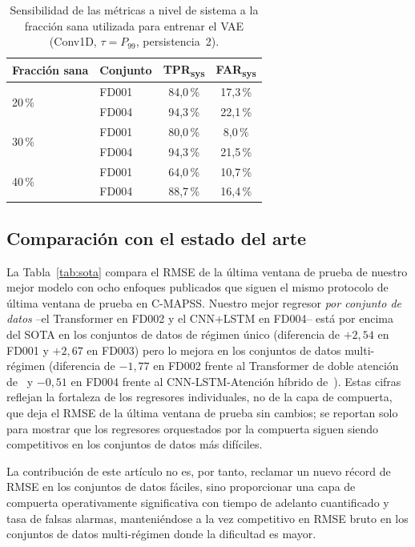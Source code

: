 \documentclass[5p,times,authoryear]{elsarticle}
\begin{document}
\begin{table}[!t]
\centering
\caption{Sensibilidad de las métricas a nivel de sistema a la fracción sana utilizada para entrenar el VAE (Conv1D, $\tau{=}P_{99}$, persistencia~2).}
\label{tab:c5}
\small
\begin{tabular}{llcc}
\toprule
Fracción sana & Conjunto & TPR\textsubscript{sys} & FAR\textsubscript{sys} \\
\midrule
\multirow{2}{*}{20\,\%} & FD001 & 84,0\,\% & 17,3\,\% \\
                        & FD004 & 94,3\,\% & 22,1\,\% \\
\multirow{2}{*}{30\,\%} & FD001 & 80,0\,\% & 8,0\,\% \\
                        & FD004 & 94,3\,\% & 21,5\,\% \\
\multirow{2}{*}{40\,\%} & FD001 & 64,0\,\% & 10,7\,\% \\
                        & FD004 & 88,7\,\% & 16,4\,\% \\
\bottomrule
\end{tabular}
\end{table}

\subsection{Comparación con el estado del arte}\label{sec:results-sota}

La Tabla~\ref{tab:sota} compara el RMSE de la última ventana de prueba de nuestro mejor modelo con ocho enfoques publicados que siguen el mismo protocolo de última ventana de prueba en C-MAPSS. Nuestro mejor regresor \emph{por conjunto de datos} --el Transformer en FD002 y el CNN+LSTM en FD004-- está por encima del SOTA en los conjuntos de datos de régimen único (diferencia de $+2{,}54$ en FD001 y $+2{,}67$ en FD003) pero lo mejora en los conjuntos de datos multi-régimen (diferencia de $-1{,}77$ en FD002 frente al Transformer de doble atención de~\citet{liu2023dual} y $-0{,}51$ en FD004 frente al CNN-LSTM-Atención híbrido de~\citet{wang2024hybrid}). Estas cifras reflejan la fortaleza de los regresores individuales, no de la capa de compuerta, que deja el RMSE de la última ventana de prueba sin cambios; se reportan solo para mostrar que los regresores orquestados por la compuerta siguen siendo competitivos en los conjuntos de datos más difíciles.

La contribución de este artículo no es, por tanto, reclamar un nuevo récord de RMSE en los conjuntos de datos fáciles, sino proporcionar una capa de compuerta operativamente significativa con tiempo de adelanto cuantificado y tasa de falsas alarmas, manteniéndose a la vez competitivo en RMSE bruto en los conjuntos de datos multi-régimen donde la dificultad es mayor.
\end{document}
